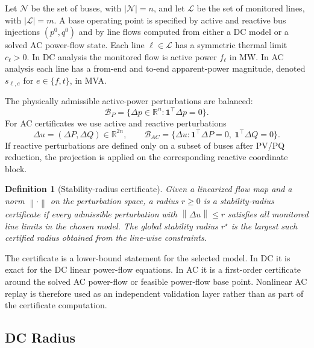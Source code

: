 \documentclass[11pt]{article}
\newtheorem{definition}{Definition}
\newcommand{\R}{\mathbb{R}}
\newcommand{\ones}{\mathbf{1}}
\newcommand{\norm}[1]{\left\lVert #1 \right\rVert}
\begin{document}
Let $\mathcal{N}$ be the set of buses, with $|\mathcal{N}|=n$, and let $\mathcal{L}$ be the set of monitored lines, with $|\mathcal{L}|=m$. A base operating point is specified by active and reactive bus injections $(p^0,q^0)$ and by line flows computed from either a DC model or a solved AC power-flow state. Each line $\ell\in\mathcal{L}$ has a symmetric thermal limit $c_\ell>0$. In DC analysis the monitored flow is active power $f_\ell$ in MW. In AC analysis each line has a from-end and to-end apparent-power magnitude, denoted $s_{\ell,e}$ for $e\in\{f,t\}$, in MVA.

The physically admissible active-power perturbations are balanced:
\begin{equation}
  \mathcal{B}_P = \{ \Delta p\in\R^n : \ones^\top \Delta p = 0 \}.
\end{equation}
For AC certificates we use active and reactive perturbations
\begin{equation}
  \Delta u = (\Delta P,\Delta Q)\in\R^{2n},
  \qquad
  \mathcal{B}_{AC} =
  \{ \Delta u : \ones^\top\Delta P=0,\ \ones^\top\Delta Q=0 \}.
\end{equation}
If reactive perturbations are defined only on a subset of buses after PV/PQ reduction, the projection is applied on the corresponding reactive coordinate block.

\begin{definition}[Stability-radius certificate]
Given a linearized flow map and a norm $\norm{\cdot}$ on the perturbation space, a radius $r\ge 0$ is a stability-radius certificate if every admissible perturbation with $\norm{\Delta u}\le r$ satisfies all monitored line limits in the chosen model. The global stability radius $r^\star$ is the largest such certified radius obtained from the line-wise constraints.
\end{definition}

The certificate is a lower-bound statement for the selected model. In DC it is exact for the DC linear power-flow equations. In AC it is a first-order certificate around the solved AC power-flow or feasible power-flow base point. Nonlinear AC replay is therefore used as an independent validation layer rather than as part of the certificate computation.

\subsection{DC Radius}
\end{document}
